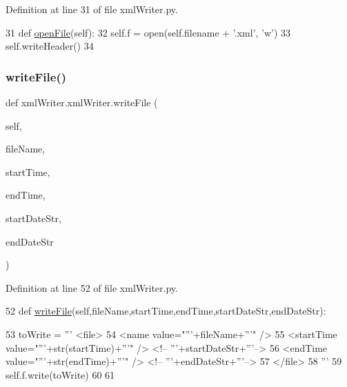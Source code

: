 Definition at line 31 of file xml\+Writer.\+py.


\begin{DoxyCode}
31     \textcolor{keyword}{def }\mbox{\hyperlink{classxml_writer_1_1xml_writer_a9697485604ee2a4be4fff52911fea34f}{openFile}}(self):
32         self.f = open(self.filename + \textcolor{stringliteral}{'.xml'}, \textcolor{stringliteral}{'w'})
33         self.writeHeader()
34     
\end{DoxyCode}
\mbox{\label{classxml_writer_1_1xml_writer_ab686ea3fea2fc1122eb2878aaa61e6b7}} 
\subsubsection{\texorpdfstring{write\+File()}{writeFile()}}
{\footnotesize\ttfamily def xml\+Writer.\+xml\+Writer.\+write\+File (\begin{DoxyParamCaption}\item[{}]{self,  }\item[{}]{file\+Name,  }\item[{}]{start\+Time,  }\item[{}]{end\+Time,  }\item[{}]{start\+Date\+Str,  }\item[{}]{end\+Date\+Str }\end{DoxyParamCaption})}



Definition at line 52 of file xml\+Writer.\+py.


\begin{DoxyCode}
52     \textcolor{keyword}{def }\mbox{\hyperlink{classxml_writer_1_1xml_writer_ab686ea3fea2fc1122eb2878aaa61e6b7}{writeFile}}(self,fileName,startTime,endTime,startDateStr,endDateStr):                       
       
53         toWrite = \textcolor{stringliteral}{'''       <file>}
54 \textcolor{stringliteral}{            <name value="'''}+fileName+\textcolor{stringliteral}{'''" />}
55 \textcolor{stringliteral}{            <startTime value="'''}+str(startTime)+\textcolor{stringliteral}{'''" />    <!-- '''}+startDateStr+\textcolor{stringliteral}{'''-->}
56 \textcolor{stringliteral}{            <endTime value="'''}+str(endTime)+\textcolor{stringliteral}{'''" />    <!-- '''}+endDateStr+\textcolor{stringliteral}{'''-->}
57 \textcolor{stringliteral}{        </file>}
58 \textcolor{stringliteral}{'''}
59         self.f.write(toWrite)
60         
61 \end{DoxyCode}
\mbox{\label{classxml_writer_1_1xml_writer_aa05ece2d045f4be023b005b42e892736}} 
